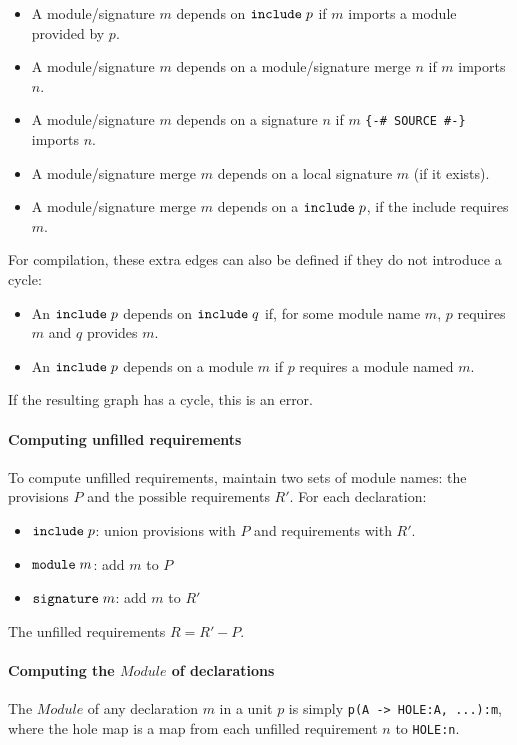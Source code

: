 \documentclass{article}
\newcommand{\I}[1]{\ensuremath{\mathit{#1}}}
\begin{document}
\begin{itemize}
    \item A module/signature $m$ depends on $\verb|include|\; p$ if $m$ imports a module provided by $p$.
    \item A module/signature $m$ depends on a module/signature merge $n$ if $m$ imports $n$.
    \item A module/signature $m$ depends on a signature $n$ if $m$ \verb|{-# SOURCE #-}| imports $n$.
    \item A module/signature merge $m$ depends on a local signature $m$ (if it exists).
    \item A module/signature merge $m$ depends on a $\verb|include|\; p$, if the include requires $m$.
\end{itemize}
%
For compilation, these extra edges can also be defined if they
do not introduce a cycle:

\begin{itemize}
    \item An $\verb|include|\; p$ depends on $\verb|include|\; q$ if, for some module name $m$, $p$ requires $m$ and $q$ provides $m$.
    \item An $\verb|include|\; p$ depends on a module $m$ if $p$ requires a module named $m$.
\end{itemize}
%
If the resulting graph has a cycle, this is an error.

\paragraph{Computing unfilled requirements}  To compute unfilled requirements,
maintain two sets of module names: the provisions $P$ and the possible requirements $R'$.  For each declaration:

\begin{itemize}
    \item $\verb|include|\; p$: union provisions with $P$ and requirements with $R'$.
    \item $\verb|module|\; m$: add $m$ to $P$
    \item $\verb|signature|\; m$: add $m$ to $R'$
\end{itemize}
%
The unfilled requirements $R=R'-P$.

\paragraph{Computing the \I{Module} of declarations}
The \I{Module} of any declaration $m$ in a unit $p$ is simply
\verb|p(A -> HOLE:A, ...):m|, where the hole map is a map
from each unfilled requirement $n$ to \verb|HOLE:n|.
\end{document}
